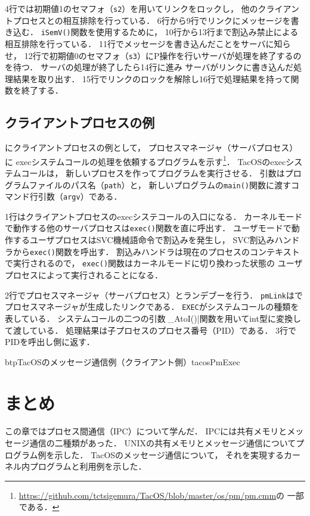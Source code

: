 4行では初期値1のセマフォ（{\tt s2}）を用いてリンクをロックし，
他のクライアントプロセスとの相互排除を行っている．
6行から9行でリンクにメッセージを書き込む．
{\tt iSemV()}関数を使用するために，
10行から13行まで割込み禁止による相互排除を行っている．
11行でメッセージを書き込んだことをサーバに知らせ，
12行で初期値0のセマフォ（{\tt s3}）にP操作を行いサーバが処理を終了するのを待つ．
サーバの処理が終了したら14行に進み
サーバがリンクに書き込んだ処理結果を取り出す．
15行でリンクのロックを解除し16行で処理結果を持って関数を終了する．

\subsection{クライアントプロセスの例}
にクライアントプロセスの例として，
プロセスマネージャ（サーバプロセス）に
execシステムコールの処理を依頼するプログラムを示す\footnote{
\url{https://github.com/tctsigemura/TacOS/blob/master/os/pm/pm.cmm}の
一部である．}．
TacOSのexecシステムコールは，
新しいプロセスを作ってプログラムを実行させる．
引数はプログラムファイルのパス名（{\tt path}）と，
新しいプログラムの{\tt main()}関数に渡すコマンド行引数（{\tt argv}）である．

1行はクライアントプロセスのexecシステコールの入口になる．
カーネルモードで動作する他のサーバプロセスは{\tt exec()}関数を直に呼出す．
ユーザモードで動作するユーザプロセスはSVC機械語命令で割込みを発生し，
SVC割込みハンドラから{\tt exec()}関数を呼出す．
割込みハンドラは現在のプロセスのコンテキストで実行されるので，
{\tt exec()}関数はカーネルモードに切り換わった状態の
ユーザプロセスによって実行されることになる．

2行でプロセスマネージャ（サーバプロセス）とランデブーを行う．
{\tt pmLink}はで
プロセスマネージャが生成したリンクである．
{\tt EXEC}がシステムコールの種類を表している．
システムコールの二つの引数は\|_AtoI()|関数を用いてint型に変換して渡している．
処理結果は子プロセスのプロセス番号（PID）である．
3行でPIDを呼出し側に返す．

\begin{myfig}{btp}{TacOSのメッセージ通信例（クライアント側）}{tacosPmExec}

\end{myfig}

\section{まとめ}
この章ではプロセス間通信（IPC）について学んだ．
IPCには共有メモリとメッセージ通信の二種類があった．
UNIXの共有メモリとメッセージ通信についてプログラム例を示した．
TacOSのメッセージ通信について，
それを実現するカーネル内プログラムと利用例を示した．
